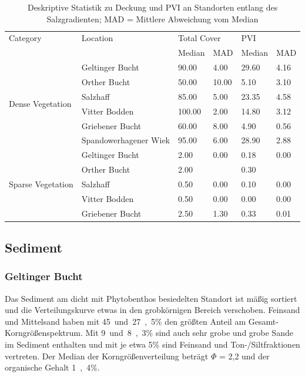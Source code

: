 \begin{table}[!htb]
\centering
\caption[Deskriptive Statistik, Deckung und PVI entlang des Salzgradienten]{Deskriptive Statistik zu Deckung und PVI an Standorten entlang des Salzgradienten; MAD = Mittlere Abweichung vom Median}
\begin{tabular}{llllll}
\toprule
Category & Location 							& \multicolumn{2}{l}{Total Cover} & \multicolumn{2}{l}{PVI}\\
		 &											& Median	& MAD			  & Median	& MAD\\
\midrule
\multirow{6}{*}{Dense Vegetation}& Geltinger Bucht	& 90.00		& 4.00			  & 29.60	& 4.16\\
								 & Orther Bucht		& 50.00		& 10.00			  & 5.10	& 3.10\\
								 & Salzhaff			& 85.00		& 5.00			  & 23.35	& 4.58\\
								 & Vitter Bodden	& 100.00	& 2.00			  & 14.80	& 3.12\\
								 & Griebener Bucht	& 60.00		& 8.00			  & 4.90	& 0.56\\
								 & Spandowerhagener Wiek & 95.00 & 6.00			  & 28.90	& 2.88\\
\midrule
\multirow{5}{*}{Sparse Vegetation}&Geltinger Bucht	& 2.00		& 0.00			  & 0.18	& 0.00\\
								 & Orther Bucht		& 2.00		& 				  & 0.30\\
								 & Salzhaff			& 0.50		& 0.00			  & 0.10	& 0.00\\
								 & Vitter Bodden	& 0.50		& 0.00			  & 0.00	& 0.00\\
								 & Griebener Bucht	& 2.50		& 1.30			  & 0.33	& 0.01\\
\bottomrule
\end{tabular}
\label{tab:statistik_salzgradient_Deckung,PVI}
\end{table}



\subsection{Sediment}

\subsubsection{Geltinger Bucht}

Das Sediment am dicht mit Phytobenthos besiedelten Standort ist mäßig sortiert und die Verteilungskurve etwas in den grobkörnigen Bereich verschoben. Feinsand und Mittelsand haben mit \unit{45 und 27,5}{\%} den größten Anteil am Gesamt-Korngrößenspektrum. Mit \unit{9 und 8,3}{\%} sind auch sehr grobe und grobe Sande im Sediment enthalten und mit je etwa \unit{5}{\%} sind Feinsand und Ton-/Siltfraktionen vertreten. Der Median der Korngrößenverteilung beträgt $ \Phi $ = 2,2 und der organische Gehalt \unit{1,4}{\%}.

